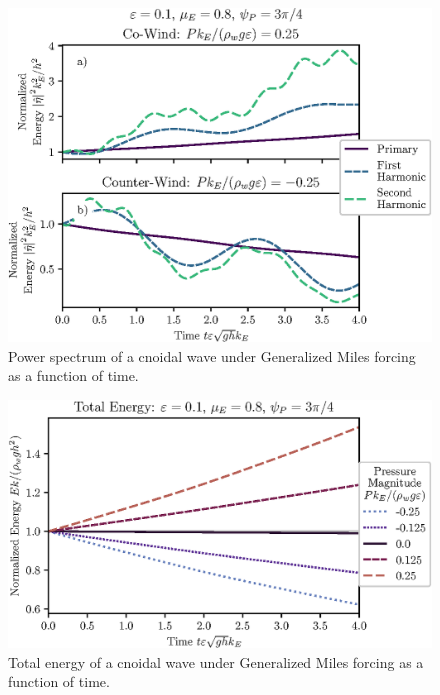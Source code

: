 \documentclass{jfm}
\begin{document}
\begin{figure}
  \centering
  \includegraphics{Power-Spectrum-vs-Time-GM.eps}
  \caption{
    Power spectrum of a cnoidal wave under Generalized Miles forcing as a
    function of time.
  }
\end{figure}

\begin{figure}
  \centering
  \includegraphics{Total-Energy-GM.eps}
  \caption{
    Total energy of a cnoidal wave under Generalized Miles forcing as a
    function of time.
  }
\end{figure}
\end{document}
